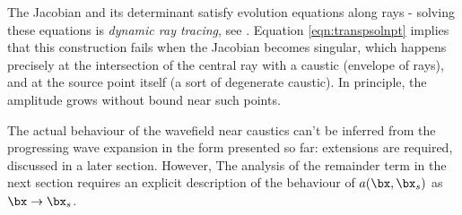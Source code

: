 The Jacobian and its determinant satisfy evolution 
equations along rays - solving these equations is {\em dynamic ray 
  tracing}, see \cite{cer85}. Equation \ref{eqn:transpsolnpt} implies that this construction fails
when the Jacobian becomes singular, which happens precisely at the
intersection of the central ray with a caustic (envelope of rays), and
at the source point itself (a sort of degenerate caustic). In principle, the
amplitude grows without bound near such points. 

The actual behaviour
of the wavefield near caustics can't be inferred from the progressing wave expansion
in the form presented so far: extensions are required, discussed in a
later section. However, The analysis of the remainder term in
the next section requires an explicit description of the behaviour of
$a(\bx,\bx_s)$ as $\bx \rightarrow \bx_s$. 

